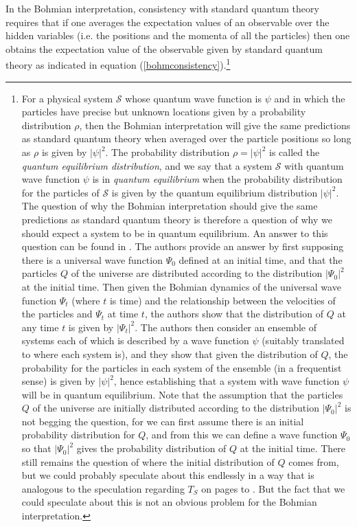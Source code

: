 In the Bohmian interpretation, consistency with standard quantum theory requires that if one averages the expectation values of an observable over the hidden variables (i.e. the positions and the momenta of all the particles) then one obtains the expectation value of the observable given by standard quantum theory as indicated in equation (\ref{bohmconsistency}).\footnote{For a physical system $\mathcal{S}$ whose quantum wave function is $\psi$ and in which the particles have precise but unknown locations given by a probability distribution $\rho$, then the Bohmian interpretation will give the same predictions as standard quantum theory when averaged over the particle positions so long as $\rho$ is given by $|\psi|^2$. The probability distribution $\rho=|\psi|^2$ is called the \emph{quantum equilibrium distribution}, and we say that a system $\mathcal{S}$  with quantum wave function $\psi$ is in \emph{quantum equilibrium} when the probability distribution for the particles of $\mathcal{S}$  is given by the quantum equilibrium distribution $|\psi|^2$. The question of why the Bohmian interpretation should give the same predictions as standard quantum theory is therefore a question of why we should expect a system to be in quantum equilibrium. An answer to this question can be found in \cite[34--51]{DurrDetlef2013Qpwq}. The authors provide an answer by first supposing there is a universal wave function $\Psi_0$ defined at an initial time, and that the particles $Q$ of the universe are distributed according to the distribution $|\Psi_0|^2$ at the initial time. Then given the Bohmian dynamics of the universal wave function $\Psi_t$ (where $t$ is time) and the relationship between the velocities of the particles and $\Psi_t$ at time $t$, the authors show that the distribution of $Q$ at any time $t$ is given by $|\Psi_t|^2$. The authors then consider an ensemble of systems each of which is described by a wave function $\psi$ (suitably translated to where each system is), and they show that given the distribution of $Q$, the probability for the particles in each system of the ensemble (in a frequentist sense) is given by $|\psi|^2$, hence establishing that a system with wave function $\psi$ will be in quantum equilibrium. Note that the assumption that the particles $Q$ of the universe are initially distributed according to the distribution $|\Psi_0|^2$ is not begging the question, for we can first assume there is an initial probability distribution for $Q$, and from this we can define a wave function $\Psi_0$ so that $|\Psi_0|^2$ gives the probability distribution of $Q$ at the initial time. There still remains the question of where the initial distribution of $Q$ comes from, but we could probably speculate about this endlessly in a way that is analogous to the speculation regarding $T_S$ on pages \pageref{selectionmeaningbeg} to \pageref{selectionmeaningend}. But the fact that we could speculate about this is not an obvious problem for the Bohmian interpretation.} 

